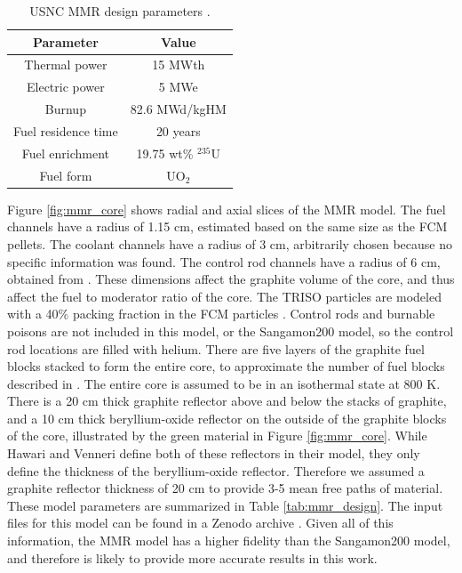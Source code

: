 \begin{table}
    \centering 
    \caption{USNC MMR design parameters \cite{noauthor_usnc_2021}.}
    \label{tab:mmr}
    \begin{tabular}{c c}
        \hline
        Parameter & Value \\
        \hline
        Thermal power & 15 MWth\\
        Electric power & 5 MWe \\
        Burnup & 82.6 MWd/kgHM \\
        Fuel residence time & 20 years\\
        Fuel enrichment & 19.75 wt\% $^{235}$U\\
        Fuel form & UO$_2$\\
        \hline
        
    \end{tabular}
\end{table}

Figure \ref{fig:mmr_core} shows radial and axial slices of the 
\gls*{MMR} model. The fuel channels have a radius of 1.15 cm, 
estimated based on the same
size as the \gls*{FCM} pellets. 
The coolant channels have a radius of 
3 cm, arbitrarily chosen because no specific information was found.
The control rod channels have a radius of 6 cm, obtained from 
\cite{hawari_development_2018}. These dimensions affect the graphite volume 
of the core, and thus affect the fuel to moderator ratio of the core. 
The \gls*{TRISO} particles are modeled with a 40\% packing fraction in 
the \gls*{FCM} particles \cite{powers_fully_2014}.
Control rods and burnable poisons are not included in this model, or 
the Sangamon200 model, so the control rod locations are filled with helium.
There are five layers of the graphite fuel blocks 
stacked to form the entire core, to approximate the number of 
fuel blocks described in \cite{noauthor_usnc_2021}. The entire core 
is assumed to be in an isothermal state at 800 K. There is a 20 cm 
thick graphite reflector above and below the stacks of graphite, 
and a 10 cm thick beryllium-oxide reflector on the outside of the 
graphite blocks of the core, illustrated by the green material in 
Figure \ref{fig:mmr_core}. While Hawari and Venneri \cite{hawari_development_2018}
define both of these reflectors in their model, they only 
define the thickness of the beryllium-oxide reflector. Therefore we 
assumed a graphite reflector thickness of 20 cm to provide 3-5 mean 
free paths of material. These model parameters are summarized in 
Table \ref{tab:mmr_design}. The input files for this model can be found 
in a Zenodo archive 
\cite{bachmann_mmr-like_2023}. Given all of this information, the \gls*{MMR} 
model has a higher fidelity than the Sangamon200 model, and therefore is 
likely to provide more accurate results in this work. 

